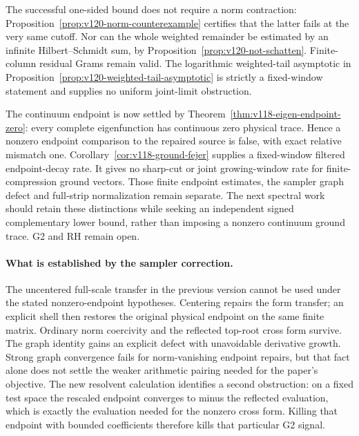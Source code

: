 \documentclass[11pt]{article}
\theoremstyle{remark}
\begin{document}
The successful one-sided bound does not require a norm contraction:
Proposition~\ref{prop:v120-norm-counterexample} certifies that the
latter fails at the very same cutoff. Nor can the whole weighted
remainder be estimated by an infinite Hilbert--Schmidt sum, by
Proposition~\ref{prop:v120-not-schatten}. Finite-column residual Grams
remain valid. The logarithmic weighted-tail asymptotic in
Proposition~\ref{prop:v120-weighted-tail-asymptotic} is strictly a
fixed-window statement and supplies no uniform joint-limit obstruction.

The continuum endpoint is now settled by
Theorem~\ref{thm:v118-eigen-endpoint-zero}: every complete eigenfunction
has continuous zero physical trace. Hence a nonzero endpoint comparison
to the repaired source is false, with exact relative mismatch one.
Corollary~\ref{cor:v118-ground-fejer} supplies a fixed-window filtered
endpoint-decay rate. It gives no sharp-cut or joint growing-window rate
for finite-compression ground vectors. Those finite endpoint estimates,
the sampler graph defect and full-strip normalization remain separate.
The next spectral work should retain these distinctions while seeking
an independent signed complementary lower bound, rather than imposing
a nonzero continuum ground trace. G2 and RH remain open.


\paragraph{What is established by the sampler correction.}
The uncentered full-scale transfer in the previous version cannot be used
under the stated nonzero-endpoint hypotheses. Centering repairs the form
transfer; an explicit shell then restores the original physical endpoint
on the same finite matrix. Ordinary norm coercivity and the reflected
top-root cross form survive. The graph identity gains an explicit defect
with unavoidable derivative growth. Strong graph convergence fails for
norm-vanishing endpoint repairs, but that fact alone does not settle the
weaker arithmetic pairing needed for the paper's objective. The new
resolvent calculation identifies a second obstruction: on a fixed test
space the rescaled endpoint converges to minus the reflected evaluation,
which is exactly the evaluation needed for the nonzero cross form.
Killing that endpoint with bounded coefficients therefore kills that
particular G2 signal.
\end{document}
